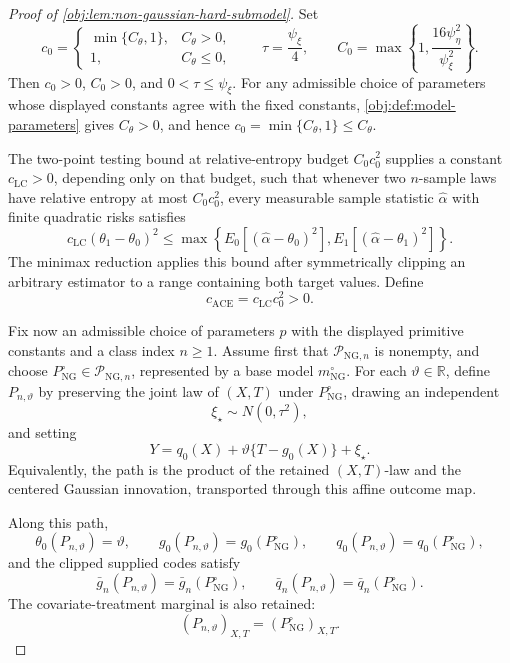 \begin{proof}[Proof of \cref{obj:lem:non-gaussian-hard-submodel}]
Set
\[
c_0=
\begin{cases}
\min\{C_{\theta},1\},& C_{\theta}>0,\\
1,& C_{\theta}\le 0,
\end{cases}
\qquad
\tau=\frac{\psi_{\xi}}4,
\qquad
C_0=\max\left\{1,\frac{16\psi_{\eta}^2}{\psi_{\xi}^2}\right\}.
\]
Then \(c_0>0\), \(C_0>0\), and \(0<\tau\le\psi_{\xi}\).  For any admissible choice of parameters whose displayed constants agree with the fixed constants, \cref{obj:def:model-parameters} gives \(C_{\theta}>0\), and hence \(c_0=\min\{C_{\theta},1\}\le C_{\theta}\). %

The two-point testing bound at relative-entropy budget \(C_0c_0^2\) supplies a constant \(c_{\mathrm{LC}}>0\), depending only on that budget, such that whenever two \(n\)-sample laws have relative entropy at most \(C_0c_0^2\), every measurable sample statistic \(\widehat\alpha\) with finite quadratic risks satisfies
\[
c_{\mathrm{LC}}(\theta_1-\theta_0)^2
\le
\max\left\{
E_0[(\widehat\alpha-\theta_0)^2],
E_1[(\widehat\alpha-\theta_1)^2]
\right\}.
\]
The minimax reduction applies this bound after symmetrically clipping an arbitrary estimator to a range containing both target values.  Define
\[
c_{\mathrm{ACE}}=c_{\mathrm{LC}}c_0^2>0 .
\]

Fix now an admissible choice of parameters \(p\) with the displayed primitive constants and a class index \(n\ge1\).  Assume first that \(\mathcal P_{\mathrm{NG},n}\) is nonempty, and choose \(P_{\mathrm{NG}}^\circ\in\mathcal P_{\mathrm{NG},n}\), represented by a base model \(m_{\mathrm{NG}}^\circ\).  For each \(\vartheta\in\mathbb R\), define \(P_{n,\vartheta}\) by preserving the joint law of \((X,T)\) under \(P_{\mathrm{NG}}^\circ\), drawing an independent
\[
\xi_\star\sim N(0,\tau^2),
\]
and setting
\[
Y=q_0(X)+\vartheta\{T-g_0(X)\}+\xi_\star .
\]
Equivalently, the path is the product of the retained \((X,T)\)-law and the centered Gaussian innovation, transported through this affine outcome map. %

Along this path,
\[
\theta_0(P_{n,\vartheta})=\vartheta,
\qquad
g_0(P_{n,\vartheta})=g_0(P_{\mathrm{NG}}^\circ),
\qquad
q_0(P_{n,\vartheta})=q_0(P_{\mathrm{NG}}^\circ),
\]
and the clipped supplied codes satisfy
\[
\bar g_n(P_{n,\vartheta})=\bar g_n(P_{\mathrm{NG}}^\circ),
\qquad
\bar q_n(P_{n,\vartheta})=\bar q_n(P_{\mathrm{NG}}^\circ).
\]
The covariate-treatment marginal is also retained:
\[
(P_{n,\vartheta})_{X,T}=(P_{\mathrm{NG}}^\circ)_{X,T}.
\]


\end{proof}
